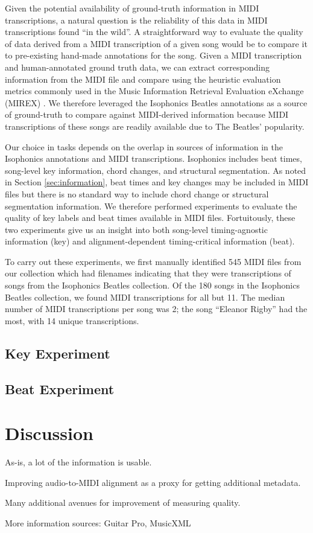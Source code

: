 \documentclass{article}
\begin{document}
Given the potential availability of ground-truth information in MIDI transcriptions, a natural question is the reliability of this data in MIDI transcriptions found ``in the wild''.
A straightforward way to evaluate the quality of data derived from a MIDI transcription of a given song would be to compare it to pre-existing hand-made annotations for the song.
Given a MIDI transcription and human-annotated ground truth data, we can extract corresponding information from the MIDI file and compare using the heuristic evaluation metrics commonly used in the Music Information Retrieval Evaluation eXchange (MIREX) \cite{downie2008music}.
We therefore leveraged the Isophonics Beatles annotations \cite{mauch2009omras2} as a source of ground-truth to compare against MIDI-derived information because MIDI transcriptions of these songs are readily available due to The Beatles' popularity.

Our choice in tasks depends on the overlap in sources of information in the Isophonics annotations and MIDI transcriptions.
Isophonics includes beat times, song-level key information, chord changes, and structural segmentation.
As noted in Section \ref{sec:information}, beat times and key changes may be included in MIDI files but there is no standard way to include chord change or structural segmentation information.
We therefore performed experiments to evaluate the quality of key labels and beat times available in MIDI files.
Fortuitously, these two experiments give us an insight into both song-level timing-agnostic information (key) and alignment-dependent timing-critical information (beat).

To carry out these experiments, we first manually identified 545 MIDI files from our collection which had filenames indicating that they were transcriptions of songs from the Isophonics Beatles collection.
Of the 180 songs in the Isophonics Beatles collection, we found MIDI transcriptions for all but 11.
The median number of MIDI transcriptions per song was 2; the song ``Eleanor Rigby'' had the most, with 14 unique transcriptions.

\subsection{Key Experiment}

\subsection{Beat Experiment}

\section{Discussion}
\label{sec:discussion}

As-is, a lot of the information is usable.

Improving audio-to-MIDI alignment as a proxy for getting additional metadata.

Many additional avenues for improvement of measuring quality.

More information sources: Guitar Pro, MusicXML


\end{document}
